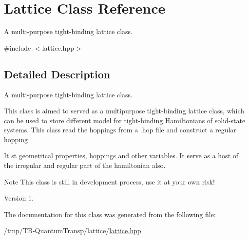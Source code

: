 \hypertarget{classLattice}{}\section{Lattice Class Reference}
\label{classLattice}


A multi-\/purpose tight-\/binding lattice class.  




{\ttfamily \#include $<$lattice.\+hpp$>$}



\subsection{Detailed Description}
A multi-\/purpose tight-\/binding lattice class. 

This class is aimed to served as a multipurpose tight-\/binding lattice class, which can be used to store different model for tight-\/binding Hamiltonians of solid-\/state systems. This class read the hoppings from a .hop file and construct a regular hopping

It st geometrical properties, hoppings and other variables. It serve as a host of the irregular and regular part of the hamiltonian also.

\begin{DoxyNote}{Note}
This class is still in development process, use it at your own risk!
\end{DoxyNote}
\begin{DoxyVersion}{Version}
1. 
\end{DoxyVersion}


The documentation for this class was generated from the following file\+:\begin{DoxyCompactItemize}
\item 
/tmp/\+T\+B-\/\+Quantum\+Transp/lattice/\hyperlink{lattice_8hpp}{lattice.\+hpp}\end{DoxyCompactItemize}
